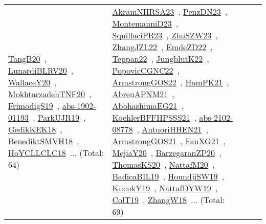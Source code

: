 {\begin{longtable}{lp{3cm}>{\raggedright\arraybackslash}p{6cm}>{\raggedright\arraybackslash}p{6cm}>{\raggedright\arraybackslash}p{8cm}}
\href{../works/TangB20.pdf}{TangB20}~\cite{TangB20}, \href{../works/LunardiBLRV20.pdf}{LunardiBLRV20}~\cite{LunardiBLRV20}, \href{../works/WallaceY20.pdf}{WallaceY20}~\cite{WallaceY20}, \href{../works/MokhtarzadehTNF20.pdf}{MokhtarzadehTNF20}~\cite{MokhtarzadehTNF20}, \href{../works/FrimodigS19.pdf}{FrimodigS19}~\cite{FrimodigS19}, \href{../works/abs-1902-01193.pdf}{abs-1902-01193}~\cite{abs-1902-01193}, \href{../works/ParkUJR19.pdf}{ParkUJR19}~\cite{ParkUJR19}, \href{../works/GedikKEK18.pdf}{GedikKEK18}~\cite{GedikKEK18}, \href{../works/BenediktSMVH18.pdf}{BenediktSMVH18}~\cite{BenediktSMVH18}, \href{../works/HoYCLLCLC18.pdf}{HoYCLLCLC18}~\cite{HoYCLLCLC18}... (Total: 64) & \href{../works/AkramNHRSA23.pdf}{AkramNHRSA23}~\cite{AkramNHRSA23}, \href{../works/PenzDN23.pdf}{PenzDN23}~\cite{PenzDN23}, \href{../works/MontemanniD23.pdf}{MontemanniD23}~\cite{MontemanniD23}, \href{../works/SquillaciPR23.pdf}{SquillaciPR23}~\cite{SquillaciPR23}, \href{../works/ZhuSZW23.pdf}{ZhuSZW23}~\cite{ZhuSZW23}, \href{../works/ZhangJZL22.pdf}{ZhangJZL22}~\cite{ZhangJZL22}, \href{../works/EmdeZD22.pdf}{EmdeZD22}~\cite{EmdeZD22}, \href{../works/Teppan22.pdf}{Teppan22}~\cite{Teppan22}, \href{../works/JungblutK22.pdf}{JungblutK22}~\cite{JungblutK22}, \href{../works/PopovicCGNC22.pdf}{PopovicCGNC22}~\cite{PopovicCGNC22}, \href{../works/ArmstrongGOS22.pdf}{ArmstrongGOS22}~\cite{ArmstrongGOS22}, \href{../works/HamPK21.pdf}{HamPK21}~\cite{HamPK21}, \href{../works/AbreuAPNM21.pdf}{AbreuAPNM21}~\cite{AbreuAPNM21}, \href{../works/AbohashimaEG21.pdf}{AbohashimaEG21}~\cite{AbohashimaEG21}, \href{../works/KoehlerBFFHPSSS21.pdf}{KoehlerBFFHPSSS21}~\cite{KoehlerBFFHPSSS21}, \href{../works/abs-2102-08778.pdf}{abs-2102-08778}~\cite{abs-2102-08778}, \href{../works/AntuoriHHEN21.pdf}{AntuoriHHEN21}~\cite{AntuoriHHEN21}, \href{../works/ArmstrongGOS21.pdf}{ArmstrongGOS21}~\cite{ArmstrongGOS21}, \href{../works/FanXG21.pdf}{FanXG21}~\cite{FanXG21}, \href{../works/MejiaY20.pdf}{MejiaY20}~\cite{MejiaY20}, \href{../works/BarzegaranZP20.pdf}{BarzegaranZP20}~\cite{BarzegaranZP20}, \href{../works/ThomasKS20.pdf}{ThomasKS20}~\cite{ThomasKS20}, \href{../works/NattafM20.pdf}{NattafM20}~\cite{NattafM20}, \href{../works/BadicaBIL19.pdf}{BadicaBIL19}~\cite{BadicaBIL19}, \href{../works/HoundjiSW19.pdf}{HoundjiSW19}~\cite{HoundjiSW19}, \href{../works/KucukY19.pdf}{KucukY19}~\cite{KucukY19}, \href{../works/NattafDYW19.pdf}{NattafDYW19}~\cite{NattafDYW19}, \href{../works/ColT19.pdf}{ColT19}~\cite{ColT19}, \href{../works/ZhangW18.pdf}{ZhangW18}~\cite{ZhangW18}... (Total: 69)\\

\end{longtable}}
